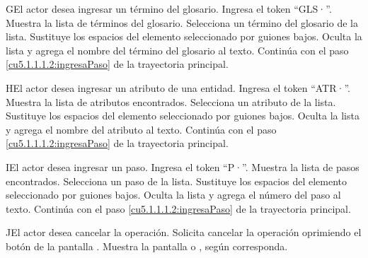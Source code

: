  \begin{UCtrayectoriaA}{G}{El actor desea ingresar un término del glosario.}
 	\UCpaso[\UCactor] Ingresa el token ``GLS·''.	
 	\UCpaso[\UCsist] Muestra la lista de términos del glosario.
 	\UCpaso[\UCactor] Selecciona un término del glosario de la lista.
  	\UCpaso[\UCsist] Sustituye los espacios del elemento seleccionado por guiones bajos.
  	\UCpaso[\UCsist] Oculta la lista y agrega el nombre del término del glosario al texto.
    \UCpaso[] Continúa con el paso \ref{cu5.1.1.1.2:ingresaPaso} de la trayectoria principal.
 \end{UCtrayectoriaA}

 \begin{UCtrayectoriaA}{H}{El actor desea ingresar un atributo de una entidad.}
 	\UCpaso[\UCactor] Ingresa el token ``ATR·''.
  	\UCpaso[\UCsist] Muestra la lista de atributos encontrados.
 	\UCpaso[\UCactor] Selecciona un atributo de la lista.
  	\UCpaso[\UCsist] Sustituye los espacios del elemento seleccionado por guiones bajos.
  	\UCpaso[\UCsist] Oculta la lista y agrega el nombre del atributo al texto.
    \UCpaso[] Continúa con el paso \ref{cu5.1.1.1.2:ingresaPaso} de la trayectoria principal.
 \end{UCtrayectoriaA}

 \begin{UCtrayectoriaA}{I}{El actor desea ingresar un paso.}
 	\UCpaso[\UCactor] Ingresa el token ``P·''.
  	\UCpaso[\UCsist] Muestra la lista de pasos encontrados.
 	\UCpaso[\UCactor] Selecciona un paso de la lista.
  	\UCpaso[\UCsist] Sustituye los espacios del elemento seleccionado por guiones bajos.
  	\UCpaso[\UCsist] Oculta la lista y agrega el número del paso al texto.
    \UCpaso[] Continúa con el paso \ref{cu5.1.1.1.2:ingresaPaso} de la trayectoria principal.
 \end{UCtrayectoriaA}

 \begin{UCtrayectoriaA}{J}{El actor desea cancelar la operación.}
    \UCpaso[\UCactor] Solicita cancelar la operación oprimiendo el botón  de la pantalla .
    \UCpaso[\UCsist] Muestra la pantalla  o , según corresponda.
 \end{UCtrayectoriaA}
 

